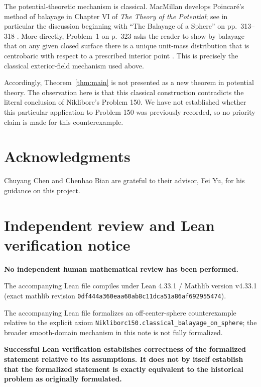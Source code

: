 \documentclass[11pt]{article}
\begin{document}
The potential-theoretic mechanism is classical. MacMillan develops Poincar\'e's method of balayage in Chapter VI of \emph{The Theory of the Potential}; see in particular the discussion beginning with ``The Balayage of a Sphere'' on pp.~313--318 \cite[pp.~313--318]{MacMillan}. More directly, Problem~1 on p.~323 asks the reader to show by balayage that on any given closed surface there is a unique unit-mass distribution that is centrobaric with respect to a prescribed interior point \cite[p.~323, Problem~1]{MacMillan}. This is precisely the classical exterior-field mechanism used above.

Accordingly, Theorem~\ref{thm:main} is not presented as a new theorem in potential theory. The observation here is that this classical construction contradicts the literal conclusion of Nikliborc's Problem 150. We have not established whether this particular application to Problem 150 was previously recorded, so no priority claim is made for this counterexample.


\section*{Acknowledgments}
Chuyang Chen and Chenhao Bian are grateful to their advisor, Fei Yu, for his guidance on this project.

\section*{Independent review and Lean verification notice}
\begingroup
\small
\begin{center}
\begin{minipage}{0.94\linewidth}
\centering
\textbf{\large No independent human mathematical review has been performed.}
\end{minipage}
\end{center}

\medskip
\noindent The accompanying Lean file compiles under Lean 4.33.1 / Mathlib version v4.33.1 (exact mathlib revision \texttt{0df444a360eaa60ab8c11dca51a86af692955474}).

\medskip
\noindent The accompanying Lean file formalizes an off-center-sphere counterexample relative to the explicit axiom \texttt{Nikliborc150.classical\_balayage\_on\_sphere}; the broader smooth-domain mechanism in this note is not fully formalized.

\medskip
\noindent\textbf{Successful Lean verification establishes correctness of the formalized statement relative to its assumptions. It does not by itself establish that the formalized statement is exactly equivalent to the historical problem as originally formulated.}
\endgroup
\end{document}
